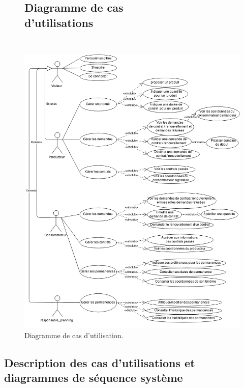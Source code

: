 \documentclass[12pt]{report}
\begin{document}
\begin{figure}[!H]
\centering
\subsection{Diagramme de cas d'utilisations~~~~~~~~~~~~~~~~~~~~~~~~~~~~~~~}
\includegraphics[height=1.35\textwidth]{./ressources/use_case.png}
\caption{Diagramme de cas d'utilisation.}
\end{figure}
\clearpage

\subsection{Description des cas d'utilisations et diagrammes de séquence système}
\end{document}
